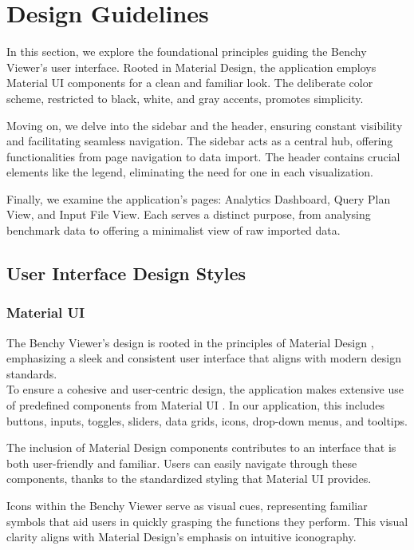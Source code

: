 
\section{Design Guidelines}
In this section, we explore the foundational principles guiding the Benchy Viewer's user interface. Rooted in Material Design, the application employs Material UI components for a clean and familiar look. The deliberate color scheme, restricted to black, white, and gray accents, promotes simplicity.

Moving on, we delve into the sidebar and the header, ensuring constant visibility and facilitating seamless navigation. The sidebar acts as a central hub, offering functionalities from page navigation to data import. The header contains crucial elements like the legend, eliminating the need for one in each visualization.

Finally, we examine the application's pages: Analytics Dashboard, Query Plan View, and Input File View. Each serves a distinct purpose, from analysing benchmark data to offering a minimalist view of raw imported data. 


\subsection{User Interface Design Styles}
\subsubsection{Material UI}

The Benchy Viewer's design is rooted in the principles of Material Design \parencite*{material-design}, emphasizing a sleek and consistent user interface that aligns with modern design standards.\\
To ensure a cohesive and user-centric design, the application makes extensive use of predefined components from Material UI \parencite*{mui}. In our application, this includes buttons, inputs, toggles, sliders, data grids, icons, drop-down menus, and tooltips.

The inclusion of Material Design components contributes to an interface that is both user-friendly and familiar. Users can easily navigate through these components, thanks to the standardized styling that Material UI provides.

Icons within the Benchy Viewer serve as visual cues, representing familiar symbols that aid users in quickly grasping the functions they perform. This visual clarity aligns with Material Design's emphasis on intuitive iconography.

